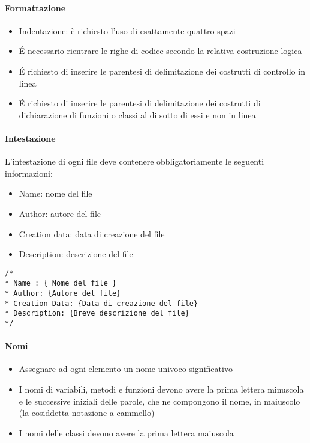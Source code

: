 \paragraph{Formattazione}
\begin{itemize}
\item Indentazione: è richiesto l'uso di esattamente quattro spazi
\item \'E necessario rientrare le righe di codice secondo la relativa costruzione  logica
\item \'E richiesto di inserire le parentesi di delimitazione dei costrutti di controllo in linea
\item \'E richiesto di inserire le parentesi di delimitazione dei costrutti di dichiarazione di funzioni o classi
  al di sotto di essi e non in linea

\end{itemize}

\paragraph{Intestazione}

L’intestazione di ogni file deve contenere obbligatoriamente le seguenti informazioni:
\begin{itemize}
\item Name: nome del file
\item Author: autore del file
\item Creation data: data di creazione del file
\item Description: descrizione del file
\end{itemize}

\begin{verbatim}
/*
* Name : { Nome del file }
* Author: {Autore del file}
* Creation Data: {Data di creazione del file}
* Description: {Breve descrizione del file}
*/
\end{verbatim}

\paragraph{Nomi}
\begin{itemize}
\item Assegnare ad ogni elemento un nome univoco significativo
\item I nomi di variabili, metodi e funzioni devono avere la prima lettera minuscola e  le successive iniziali delle parole, che ne compongono il nome, in maiuscolo (la cosiddetta notazione a cammello)
\item I nomi delle classi devono avere la prima lettera maiuscola
\end{itemize}

